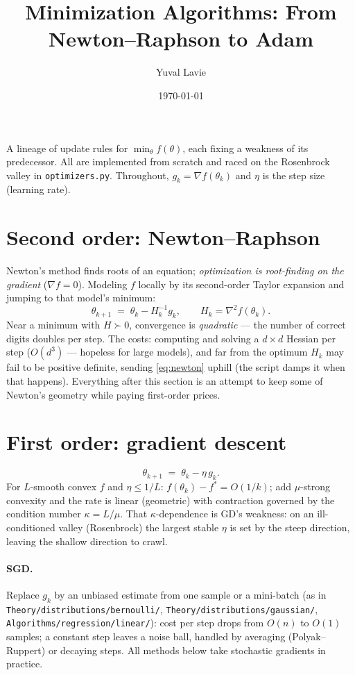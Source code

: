 \documentclass[11pt]{article}
\title{Minimization Algorithms: From Newton--Raphson to Adam}
\author{Yuval Lavie}
\date{\today}
\begin{document}
\maketitle

\noindent
A lineage of update rules for $\min_\theta f(\theta)$, each fixing a
weakness of its predecessor. All are implemented from scratch and raced on
the Rosenbrock valley in \texttt{optimizers.py}. Throughout, $g_k =
\nabla f(\theta_k)$ and $\eta$ is the step size (learning rate).

\section{Second order: Newton--Raphson}

Newton's method finds roots of an equation; \emph{optimization is
root-finding on the gradient} ($\nabla f = 0$). Modeling $f$ locally by
its second-order Taylor expansion and jumping to that model's minimum:
\begin{equation}
  \theta_{k+1} \;=\; \theta_k - H_k^{-1} g_k ,
  \qquad H_k = \nabla^2 f(\theta_k).
  \label{eq:newton}
\end{equation}
Near a minimum with $H \succ 0$, convergence is \emph{quadratic} — the
number of correct digits doubles per step. The costs: computing and
solving a $d\times d$ Hessian per step ($O(d^3)$ — hopeless for large
models), and far from the optimum $H_k$ may fail to be positive definite,
sending \eqref{eq:newton} uphill (the script damps it when that happens).
Everything after this section is an attempt to keep some of Newton's
geometry while paying first-order prices.

\section{First order: gradient descent}

\begin{equation}
  \theta_{k+1} \;=\; \theta_k - \eta\, g_k .
  \label{eq:gd}
\end{equation}
For $L$-smooth convex $f$ and $\eta \le 1/L$: $f(\theta_k)-f^\ast =
O(1/k)$; add $\mu$-strong convexity and the rate is linear (geometric)
with contraction governed by the condition number $\kappa = L/\mu$. That
$\kappa$-dependence is GD's weakness: on an ill-conditioned valley
(Rosenbrock) the largest stable $\eta$ is set by the steep direction,
leaving the shallow direction to crawl.

\paragraph{SGD.} Replace $g_k$ by an unbiased estimate from one sample or
a mini-batch (as in \texttt{Theory/distributions/bernoulli/}, \texttt{Theory/distributions/gaussian/},
\texttt{Algorithms/regression/linear/}): cost per step drops from $O(n)$ to $O(1)$
samples; a constant step leaves a noise ball, handled by averaging
(Polyak--Ruppert) or decaying steps. All methods below take stochastic
gradients in practice.
\end{document}
